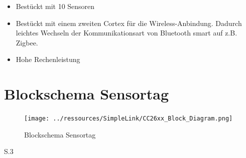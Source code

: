 \begin{itemize}
    \item Bestückt mit 10 Sensoren
    \item Bestückt mit einem zweiten Cortex für die Wireless-Anbindung.
          Dadurch leichtes Wechseln der Kommunikationsart von Bluetooth smart auf z.B. Zigbee.
    \item Hohe Rechenleistung
\end{itemize}


\section{Blockschema Sensortag}

\begin{figure}[h]
    \texttt{[image: ../ressources/SimpleLink/CC26xx\_Block\_Diagram.png]} 
     \caption{Blockschema Sensortag}
\end{figure}

\cite{Sensortag_Datasheet}S.3


%
%
%
%
%